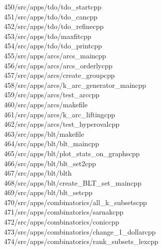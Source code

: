 \begin{tabbing}
450\>/src/apps/tdo/tdo\_startcpp\\[0pt]
451\>/src/apps/tdo/tdo\_cancpp\\[0pt]
452\>/src/apps/tdo/tdo\_refinecpp\\[0pt]
453\>/src/apps/tdo/maxfitcpp\\[0pt]
454\>/src/apps/tdo/tdo\_printcpp\\[0pt]
455\>/src/apps/arcs/arcs\_maincpp\\[0pt]
456\>/src/apps/arcs/arcs\_orderlycpp\\[0pt]
457\>/src/apps/arcs/create\_groupcpp\\[0pt]
458\>/src/apps/arcs/k\_arc\_generator\_maincpp\\[0pt]
459\>/src/apps/arcs/test\_arccpp\\[0pt]
460\>/src/apps/arcs/makefile\\[0pt]
461\>/src/apps/arcs/k\_arc\_liftingcpp\\[0pt]
462\>/src/apps/arcs/test\_hyperovalcpp\\[0pt]
463\>/src/apps/blt/makefile\\[0pt]
464\>/src/apps/blt/blt\_maincpp\\[0pt]
465\>/src/apps/blt/plot\_stats\_on\_graphscpp\\[0pt]
466\>/src/apps/blt/blt\_set2cpp\\[0pt]
467\>/src/apps/blt/blth\\[0pt]
468\>/src/apps/blt/create\_BLT\_set\_maincpp\\[0pt]
469\>/src/apps/blt/blt\_setcpp\\[0pt]
470\>/src/apps/combinatorics/all\_k\_subsetscpp\\[0pt]
471\>/src/apps/combinatorics/sarnakcpp\\[0pt]
472\>/src/apps/combinatorics/coniccpp\\[0pt]
473\>/src/apps/combinatorics/change\_1\_dollarcpp\\[0pt]
474\>/src/apps/combinatorics/rank\_subsets\_lexcpp\\[0pt]

\end{tabbing}
